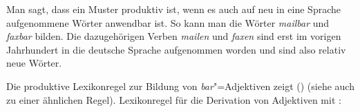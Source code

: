 Man sagt, dass ein Muster produktiv ist, wenn es auch auf neu in eine Sprache
aufgenommene Wörter anwendbar ist. So kann man \zb die Wörter \emph{mailbar} und \emph{faxbar}
bilden. Die dazugehörigen Verben \emph{mailen} und \emph{faxen} sind erst im vorigen Jahrhundert in
die deutsche Sprache aufgenommen worden und sind also relativ neue Wörter.

Die produktive Lexikonregel zur Bildung von \emph{bar}"=Adjektiven zeigt () (siehe auch 
zu einer ähnlichen Regel).
\eas
\label{lr-bar-adj}%
Lexikonregel für die Derivation von Adjektiven mit \bars:\\
\zs
